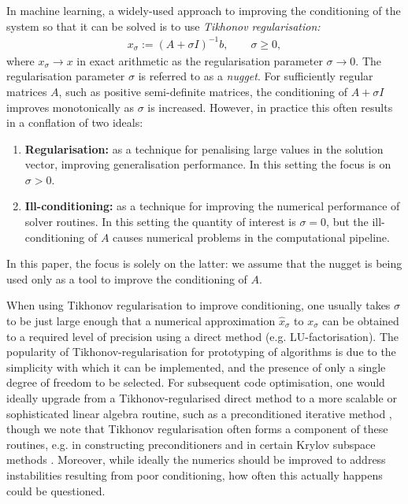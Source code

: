 \documentclass[10pt]{article} %
\newcommand{\nugget}{\sigma}
\begin{document}
In machine learning, a widely-used approach to improving the conditioning of the system so that it can be solved is to use \emph{Tikhonov regularisation:}
\begin{align}
    x_\nugget := (A + \nugget I)^{-1} b, \qquad \nugget \geq 0, \label{eq: tik}
\end{align}
where $x_\nugget \rightarrow x$ in exact arithmetic as the regularisation parameter $\nugget \rightarrow 0$.
The regularisation parameter $\nugget$ is referred to as a \emph{nugget}.
For sufficiently regular matrices $A$, such as positive semi-definite matrices, the conditioning of $A + \nugget I$ improves monotonically as $\nugget$ is increased.
However, in practice this often results in a conflation of two ideals:
\begin{enumerate}
    \item \textbf{Regularisation:} as a technique for penalising large values in the solution vector, improving generalisation performance. In this setting the focus is on $\nugget > 0$.
    \item \textbf{Ill-conditioning:} as a technique for improving the numerical performance of solver routines. In this setting the quantity of interest is $\nugget = 0$, but the ill-conditioning of $A$ causes numerical problems in the computational pipeline.
\end{enumerate}
In this paper, the focus is solely on the latter: we assume that the nugget is being used only as a tool to improve the conditioning of $A$.

When using Tikhonov regularisation to improve conditioning, one usually takes $\nugget$ to be just large enough that a numerical approximation $\hat{x}_\nugget$ to $x_\nugget$ can be obtained to a required level of precision using a direct method (e.g. LU-factorisation).
The popularity of Tikhonov-regularisation for prototyping of algorithms is due to the simplicity with which it can be implemented, and the presence of only a single degree of freedom to be selected.
For subsequent code optimisation, one would ideally upgrade from a Tikhonov-regularised direct method to a more scalable or sophisticated linear algebra routine, such as a preconditioned iterative method \citep{trefethen2022numerical}, though we note that Tikhonov regularisation often forms a component of these routines, e.g. in constructing preconditioners \citep{cutajar2016preconditioning} and in certain Krylov subspace methods \citep{gazzola2015krylov}.
Moreover, while ideally the numerics should be improved to address instabilities resulting from poor conditioning, how often this actually happens could be questioned.
\end{document}
